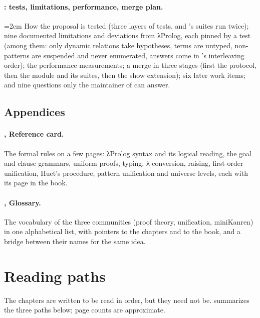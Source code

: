 \paragraph{: tests, limitations, performance, merge plan.} {\emergencystretch=2em How the proposal is tested
(three layers of tests, and \micro's suites run twice); nine documented limitations and deviations from
λProlog, each pinned by a test (among them: only dynamic relations take hypotheses, terms are untyped,
non-patterns are suspended and never enumerated, answers come in \micro's interleaving order); the
performance measurements; a merge in three stages (first the protocol, then the module and its suites,
then the show extension); six later work items; and nine questions only the maintainer of \aux{} can
answer.\par}

\subsection*{Appendices}

\paragraph{, Reference card.} The formal rules on a few pages: λProlog syntax and its
logical reading, the goal and clause grammars, uniform proofs, typing, λ-conversion, raising, first-order
unification, Huet's procedure, pattern unification and universe levels, each with its page in the book.

\paragraph{, Glossary.} The vocabulary of the three communities (proof theory,
unification, miniKanren) in one alphabetical list, with pointers to the chapters and to the book, and a
bridge between their names for the same idea.

\section{Reading paths}\label{sec:intro-paths}

The chapters are written to be read in order, but they need not be.  summarizes the
three paths below; page counts are approximate.

